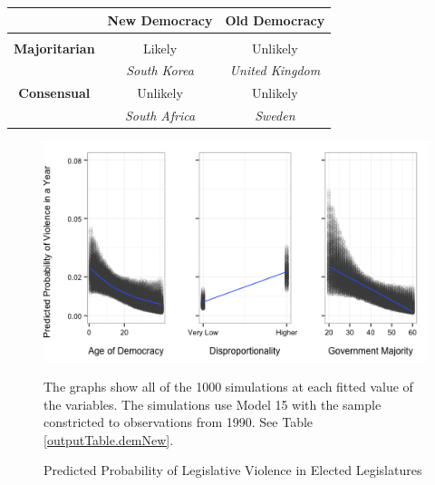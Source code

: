 \documentclass[a4paper]{article}\usepackage{graphicx, color}
\newenvironment{knitrout}{}{} %
\begin{document}
{{\begin{table}[!h]
\begin{center}
\begin{tabular}{c | c c}
        & {\bf{New Democracy}} & {\bf{Old Democracy}} \\[0.25cm]
        \hline \\[0.25cm]
        {\bf{Majoritarian}} & Likely & Unlikely \\[0.25cm]
        & {\emph{South Korea}} & {\emph{United Kingdom}} \\[0.5cm]
        {\bf{Consensual}} & Unlikely & Unlikely \\[0.25cm]
         & {\emph{South Africa}} & {\emph{Sweden}} \\[0.25cm]
        \hline

    \end{tabular}
    \end{center}
\end{table}





\begin{figure}[t]
    \caption{Predicted Probability of Legislative Violence in Elected Legislatures}  
    \label{pred_prob}
    \begin{center}


\begin{knitrout}
\color{fgcolor}\includegraphics[width=0.8\linewidth]{figure/predProb} 
\end{knitrout}

    \end{center}
    \begin{singlespace}
      {\scriptsize{The graphs show all of the 1000 simulations at each fitted value of the variables. The simulations use Model 15 with the sample constricted to observations from 1990. See Table \ref{outputTable.demNew}.}}
    \end{singlespace}
\end{figure}

}}
\end{document}
